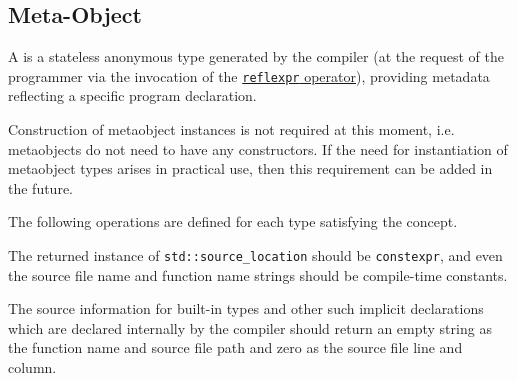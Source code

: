 \subsection{Meta-Object}
\label{concept-Meta-Object}

A  is a stateless anonymous type generated by the compiler
(at the request of the programmer via the invocation of the
\hyperref[section-reflection-operator]{\texttt{reflexpr} operator}),
providing metadata reflecting a specific program declaration.

Construction of metaobject instances is not required at this moment, i.e. metaobjects
do not need to have any constructors.
If the need for instantiation of metaobject types arises in practical use,
then this requirement can be added in the future.





The following operations are defined for each type satisfying the 
concept.



The returned instance of \texttt{std::source\_location} should be \texttt{constexpr},
and even the source file name and function name strings should be compile-time constants.

The source information for built-in types and other
such implicit declarations which are declared internally by the compiler
should return an empty string as the function name and source file path and
zero as the source file line and column.
